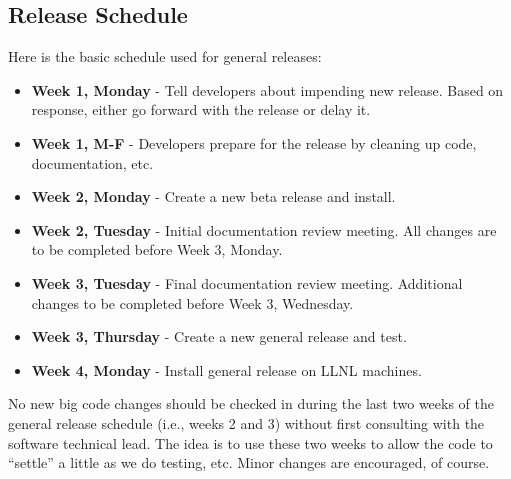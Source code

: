 \subsection{Release Schedule}
\label{Release Schedule}

Here is the basic schedule used for general releases:
\begin{itemize}
\item {\bf Week 1, Monday} - Tell developers about impending new release.
Based on response, either go forward with the release or delay it.
\item {\bf Week 1, M-F} - Developers prepare for the release by cleaning
up code, documentation, etc.
\item {\bf Week 2, Monday} - Create a new beta release and install.
\item {\bf Week 2, Tuesday} - Initial documentation review meeting.
All changes are to be completed before Week 3, Monday.
\item {\bf Week 3, Tuesday} - Final documentation review meeting.
Additional changes to be completed before Week 3, Wednesday.
\item {\bf Week 3, Thursday} - Create a new general release and test.
\item {\bf Week 4, Monday} - Install general release on LLNL machines.
\end{itemize}

No new big code changes should be checked in during the last two weeks
of the general release schedule (i.e., weeks 2 and 3) without first
consulting with the \hypre{} software technical lead.  The idea is to
use these two weeks to allow the code to ``settle'' a little as we do
testing, etc.  Minor changes are encouraged, of course.
